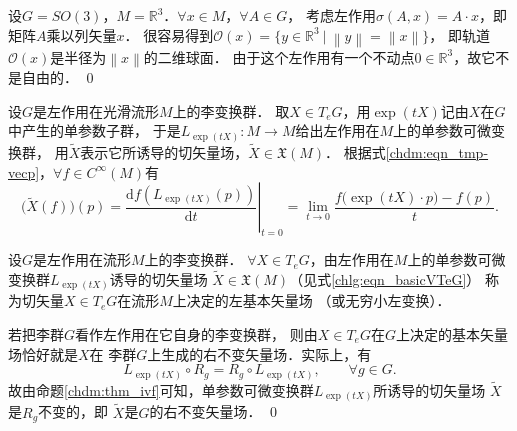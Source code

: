 \begin{example}
    设$G=SO(3)$，$M=\mathbb{R}^3$．$\forall x\in M$，$\forall A\in G$，
    考虑左作用$\sigma(A,x)=A\cdot x$，即矩阵$A$乘以列矢量$x$．
    很容易得到$\mathcal{O}(x)=\{y\in \mathbb{R}^3 \ |\   \left\|y\right\|=\left\|x\right\| \}$，
    即轨道$\mathcal{O}(x)$是半径为$\left\|x\right\|$的二维球面．
    由于这个左作用有一个不动点$0\in \mathbb{R}^3$，故它不是自由的． \qed
\end{example}



设$G$是左作用在光滑流形$M$上的李变换群．
取$X \in T_e G$，用$\exp(tX)$记由$X$在$G$中产生的单参数子群，
于是$L_{\exp(tX)}: M \rightarrow M$给出左作用在$M$上的单参数可微变换群，
用$\widetilde{X}$表示它所诱导的切矢量场，$\widetilde{X} \in \mathfrak{X}(M)$．
根据式\eqref{chdm:eqn_tmp-vecp}，$\forall f \in C^{\infty}(M)$有
\begin{equation}\label{chlg:eqn_basicVTeG}
    \bigl(\widetilde{X}(f)\bigr)(p) = \left.\frac{\mathrm{d} f\left(L_{\exp(tX)}(p)\right)}{\mathrm{d} t}\right|_{t=0} 
    =\lim _{t \rightarrow 0} \frac{f\bigl(\exp(tX)\cdot p\bigr)-f(p)}{t} .
\end{equation}


\begin{definition}\label{chlg:def_left-basicV}
    设$G$是左作用在流形$M$上的李变换群．
    $\forall X \in T_e G$，由左作用在$M$上的单参数可微变换群$L_{\exp (t  X)}$诱导的切矢量场
    $\widetilde{X} \in \mathfrak{X}(M)$（见式\eqref{chlg:eqn_basicVTeG}）
    称为切矢量$X \in T_e G$在流形$M$上决定的{\heiti 左基本矢量场}
    （或{\heiti 无穷小左变换}）．
\end{definition} 


\begin{example}\label{chlg:exm_ltmpa}
    若把李群$G$看作左作用在它自身的李变换群，
    则由$X \in T_e G$在$G$上决定的基本矢量场恰好就是$X$在
    李群$G$上生成的右不变矢量场．实际上，有
    \begin{equation}
        L_{\exp (t X)} \circ R_g = R_g \circ L_{\exp (t X)},\qquad \forall g \in G.
    \end{equation}
    故由命题\ref{chdm:thm_ivf}可知，单参数可微变换群$L_{\exp(t X)}$所诱导的切矢量场
    $\widetilde{X}$是$R_{g}$不变的，即 $\widetilde{X}$是$G$的右不变矢量场． \qed
\end{example}


